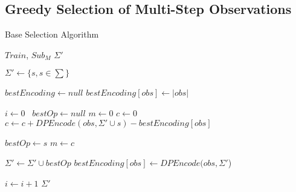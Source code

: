 \subsection{Greedy Selection of Multi-Step Observations}

%
%
%
%
%

\begin{algorithm}
\caption{Base Selection Algorithm}
\label{Base Selection Algorithm}
\begin{algorithmic}[1]
\INPUT $Train$, $Sub_M$
\OUTPUT $\Sigma'$

\State $\Sigma' \gets \{s, s \in \sum \}$

\State $bestEncoding \gets null$
	\State $bestEncoding[obs] \gets |obs|$
\EndFor

\State $i \gets 0$\
	\State $bestOp \gets null$
	\State $m \gets 0$
		\State $c \gets 0$
			\State $c \gets c+DPEncode(obs, \Sigma' \cup s)-bestEncoding[obs]$
		\EndFor
		
			\State $bestOp \gets s$
			\State $m \gets c$
		\EndIf
		
	\EndFor

	\State $\Sigma' \gets \Sigma' \cup bestOp$
		\State $bestEncoding[obs] \gets DPEncode(obs,\Sigma'$) 
	\EndFor	
	
	\State $i \gets i + 1$
\EndWhile 
\State \Return $\Sigma'$

\EndProcedure
\end{algorithmic}
\end{algorithm}


